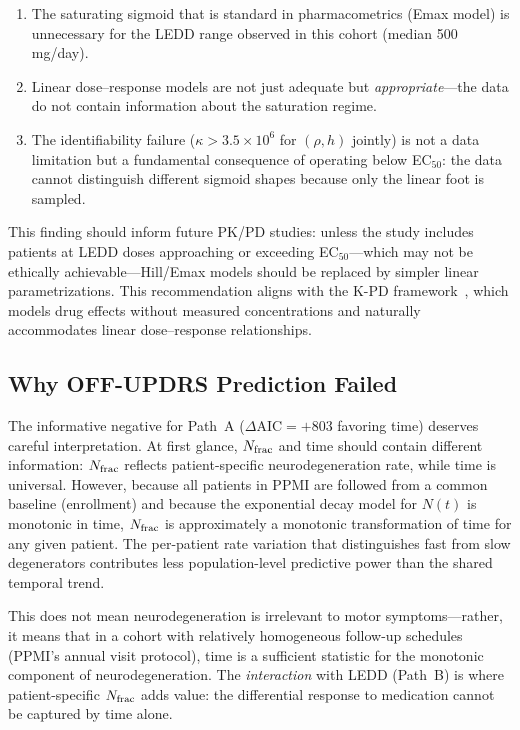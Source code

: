 \begin{enumerate}
  \item The saturating sigmoid that is standard in pharmacometrics
    (Emax model) is unnecessary for the LEDD range observed in this
    cohort (median 500 mg/day).
  \item Linear dose--response models are not just adequate but
    \textit{appropriate}---the data do not contain information about
    the saturation regime.
  \item The identifiability failure ($\kappa > 3.5 \times 10^6$ for
    $(\rho, h)$ jointly) is not a data limitation but a fundamental
    consequence of operating below EC$_{50}$: the data cannot
    distinguish different sigmoid shapes because only the linear
    foot is sampled.
\end{enumerate}

This finding should inform future PK/PD studies: unless the study
includes patients at LEDD doses approaching or exceeding EC$_{50}$---which
may not be ethically achievable---Hill/Emax models should be replaced
by simpler linear parametrizations. This recommendation aligns with the
K-PD framework~\cite{jacqmin2007}, which models drug effects without
measured concentrations and naturally accommodates linear
dose--response relationships.


\subsection{Why OFF-UPDRS Prediction Failed}

The informative negative for Path~A ($\Delta\text{AIC} = +803$ favoring
time) deserves careful interpretation. At first glance, $N_{\mathrm{frac}}$ and
time should contain different information: $N_{\mathrm{frac}}$ reflects patient-specific
neurodegeneration rate, while time is universal. However, because all
patients in PPMI are followed from a common baseline (enrollment) and
because the exponential decay model for $N(t)$ is monotonic in time,
$N_{\mathrm{frac}}$ is approximately a monotonic transformation of time for any
given patient. The per-patient rate variation that distinguishes fast
from slow degenerators contributes less population-level predictive power
than the shared temporal trend.

This does not mean neurodegeneration is irrelevant to motor
symptoms---rather, it means that in a cohort with relatively homogeneous
follow-up schedules (PPMI's annual visit protocol), time is a sufficient
statistic for the monotonic component of neurodegeneration. The
\textit{interaction} with LEDD (Path~B) is where patient-specific
$N_{\mathrm{frac}}$ adds value: the differential response to medication cannot be
captured by time alone.



